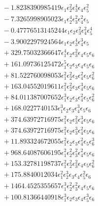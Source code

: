 \documentclass[10pt]{article}
\begin{document}
\begin{align*}
&{}  - 1.8238390985419 \epsilon_{1} \epsilon_{2}^{2} \epsilon_{3}^{4} \epsilon_{4} \epsilon_{5}^{2} \\
&{}  - 7.3265998905023 \epsilon_{1} \epsilon_{2}^{4} \epsilon_{3}^{2} \epsilon_{4}^{2} \epsilon_{5} \\
&{}  - 0.47776513145244 \epsilon_{1} \epsilon_{2} \epsilon_{3}^{2} \epsilon_{4}^{2} \epsilon_{5}^{4} \\
&{}  - 3.9002297924564 \epsilon_{1} \epsilon_{2} \epsilon_{3}^{4} \epsilon_{4}^{3} \epsilon_{5} \\
&{}  + 329.75032366647 \epsilon_{1}^{4} \epsilon_{2} \epsilon_{3}^{2} \epsilon_{4} \epsilon_{5} \epsilon_{6} \\
&{}  + 161.09736125472 \epsilon_{1}^{5} \epsilon_{2} \epsilon_{3} \epsilon_{4} \epsilon_{5} \epsilon_{6} \\
&{}  + 81.522760098053 \epsilon_{1}^{2} \epsilon_{2}^{2} \epsilon_{3} \epsilon_{4}^{2} \epsilon_{5} \epsilon_{6}^{2} \\
&{}  + 163.04552019611 \epsilon_{1}^{2} \epsilon_{2}^{2} \epsilon_{3} \epsilon_{4}^{3} \epsilon_{5} \epsilon_{6} \\
&{}  + 84.011387007652 \epsilon_{1}^{3} \epsilon_{2} \epsilon_{3} \epsilon_{4}^{2} \epsilon_{5} \epsilon_{6}^{2} \\
&{}  + 168.0227740153 \epsilon_{1}^{3} \epsilon_{2} \epsilon_{3} \epsilon_{4}^{3} \epsilon_{5} \epsilon_{6} \\
&{}  + 374.63972716975 \epsilon_{1}^{2} \epsilon_{2} \epsilon_{3}^{2} \epsilon_{4}^{3} \epsilon_{5} \epsilon_{6} \\
&{}  + 374.63972716975 \epsilon_{1}^{2} \epsilon_{2} \epsilon_{3}^{3} \epsilon_{4}^{2} \epsilon_{5} \epsilon_{6} \\
&{}  + 11.893324672055 \epsilon_{1}^{2} \epsilon_{2} \epsilon_{3} \epsilon_{4}^{2} \epsilon_{5} \epsilon_{6}^{3} \\
&{}  + 968.64087606195 \epsilon_{1}^{2} \epsilon_{2}^{2} \epsilon_{3}^{2} \epsilon_{4}^{2} \epsilon_{5} \epsilon_{6} \\
&{}  + 153.32781198737 \epsilon_{1}^{2} \epsilon_{2}^{2} \epsilon_{3}^{2} \epsilon_{4} \epsilon_{5} \epsilon_{6}^{2} \\
&{}  + 175.8840012034 \epsilon_{1}^{2} \epsilon_{2}^{3} \epsilon_{3} \epsilon_{4} \epsilon_{5}^{2} \epsilon_{6} \\
&{}  + 1464.4525355657 \epsilon_{1}^{3} \epsilon_{2}^{2} \epsilon_{3}^{2} \epsilon_{4} \epsilon_{5} \epsilon_{6} \\
&{}  + 100.81366440918 \epsilon_{1}^{3} \epsilon_{2} \epsilon_{3} \epsilon_{4} \epsilon_{5}^{3} \epsilon_{6} \\

\end{align*}
\end{document}
